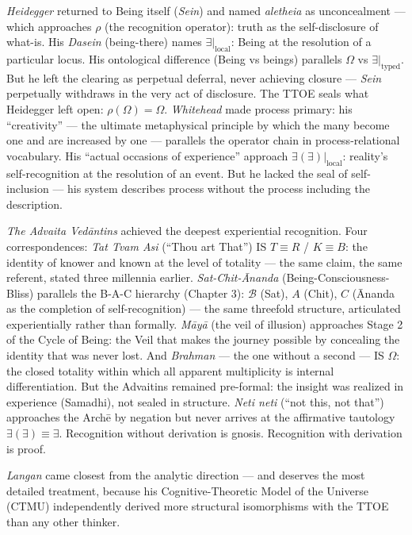 \documentclass[10pt, openany, oneside]{book}
\begin{document}
\textit{Heidegger} returned to Being itself (\textit{Sein}) and named \textit{aletheia} as unconcealment --- which approaches $\rho$ (the recognition operator): truth as the self-disclosure of what-is. His \textit{Dasein} (being-there) names $\exists|_{\text{local}}$: Being at the resolution of a particular locus. His ontological difference (Being vs beings) parallels $\Omega$ vs $\exists|_{\text{typed}}$. But he left the clearing as perpetual deferral, never achieving closure --- \textit{Sein} perpetually withdraws in the very act of disclosure. The TTOE seals what Heidegger left open: $\rho(\Omega) = \Omega$. \textit{Whitehead} made process primary: his ``creativity'' --- the ultimate metaphysical principle by which the many become one and are increased by one --- parallels the operator chain in process-relational vocabulary. His ``actual occasions of experience'' approach $\exists(\exists)|_{\text{local}}$: reality's self-recognition at the resolution of an event. But he lacked the seal of self-inclusion --- his system describes process without the process including the description.

\textit{The Advaita Ved\={a}ntins} achieved the deepest experiential recognition. Four correspondences: \textit{Tat Tvam Asi} (``Thou art That'') IS $T \equiv R$ / $K \equiv B$: the identity of knower and known at the level of totality --- the same claim, the same referent, stated three millennia earlier. \textit{Sat-Chit-\={A}nanda} (Being-Consciousness-Bliss) parallels the B-A-C hierarchy (Chapter 3): $\mathcal{B}$ (Sat), $A$ (Chit), $C$ (\={A}nanda as the completion of self-recognition) --- the same threefold structure, articulated experientially rather than formally. \textit{M\={a}y\={a}} (the veil of illusion) approaches Stage 2 of the Cycle of Being: the Veil that makes the journey possible by concealing the identity that was never lost. And \textit{Brahman} --- the one without a second --- IS $\Omega$: the closed totality within which all apparent multiplicity is internal differentiation. But the Advaitins remained pre-formal: the insight was realized in experience (Samadhi), not sealed in structure. \textit{Neti neti} (``not this, not that'') approaches the Arch\={e} by negation but never arrives at the affirmative tautology $\exists(\exists) \equiv \exists$. Recognition without derivation is gnosis. Recognition with derivation is proof.

\textit{Langan} came closest from the analytic direction --- and deserves the most detailed treatment, because his Cognitive-Theoretic Model of the Universe (CTMU) independently derived more structural isomorphisms with the TTOE than any other thinker.
\end{document}
